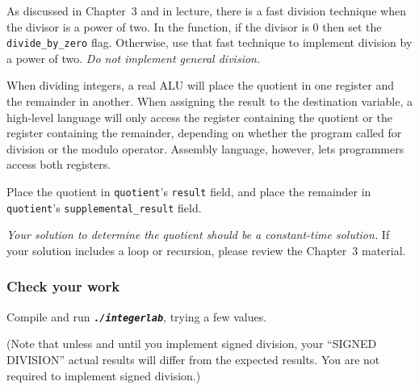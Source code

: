 As discussed in Chapter~3 and in lecture, there is a fast division technique when the divisor is a power of two.
In the  function, if the divisor is 0 then set the \lstinline{divide_by_zero} flag.
Otherwise, use that fast technique to implement division by a power of two.
\textit{Do not implement general division.}

When dividing integers, a real ALU will place the quotient in one register and the remainder in another.
When assigning the result to the destination variable, a high-level language will only access the register containing the quotient or the register containing the remainder, depending on whether the program called for division or the modulo operator.
Assembly language, however, lets programmers access both registers.

Place the quotient in \lstinline{quotient}'s \lstinline{result} field, and place the remainder in \lstinline{quotient}'s \lstinline{supplemental_result} field.

\textit{Your solution to determine the quotient should be a constant-time solution.}
If your solution includes a loop or recursion, please review the Chapter~3 material.


\subsubsection*{Check your work}

Compile and run \texttt{\textbf{\textit{./integerlab}}}, trying a few values.

(Note that unless and until you implement signed division, your ``SIGNED DIVISION'' actual results will differ from the expected results.
You are not required to implement signed division.)

